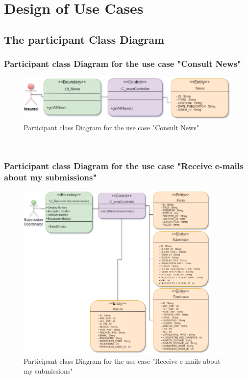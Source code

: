 \section{Design of Use Cases}
\subsection{The participant Class Diagram}
\subsubsection{Participant class Diagram for the use case "Consult News"}
\begin{figure}[h!]
    \centering
    \includegraphics[width=1\textwidth]{figures/dc see the news.png}
    \caption{Participant class Diagram for the use case "Consult News"}
\end{figure}\
\subsubsection{Participant class Diagram for the use case "Receive e-mails about my submissions"}
\begin{figure}[h!]
    \centering
    \includegraphics[width=0.9\textwidth]{figures/dc Receive emails about my submissions.png}
    \caption{Participant class Diagram for the use case "Receive e-mails about my submissions"}
    \clearpage
\end{figure}\
